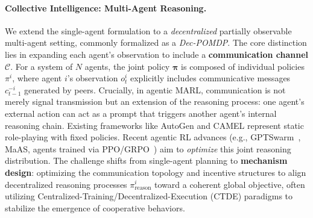 \paragraph{Collective Intelligence: Multi-Agent Reasoning.}
We extend the single-agent formulation to a \emph{decentralized} partially observable multi-agent setting, commonly formalized as a \emph{Dec-POMDP}. The core distinction lies in expanding each agent's observation to include a \textbf{communication channel} $\mathcal{C}$. For a system of $N$ agents, the joint policy $\boldsymbol{\pi}$ is composed of individual policies $\pi^i$, where agent $i$'s observation $o^i_t$ explicitly includes communicative messages $c^{-i}_{t-1}$ generated by peers.
Crucially, in agentic MARL, communication is not merely signal transmission but an extension of the reasoning process: one agent's external action can act as a prompt that triggers another agent's internal reasoning chain.
Existing frameworks like AutoGen \citep{wu2024autogen} and CAMEL \citep{li2023camel} represent static role-playing with fixed policies. Recent agentic RL advances (e.g., GPTSwarm~\cite{zhuge2024gptswarm}, MaAS, agents trained via PPO/GRPO~\cite{hong2025multi}) aim to \emph{optimize} this joint reasoning distribution. The challenge shifts from single-agent planning to \textbf{mechanism design}: optimizing the communication topology and incentive structures to align decentralized reasoning processes $\pi^i_{\text{reason}}$ toward a coherent global objective, often utilizing Centralized-Training/Decentralized-Execution (CTDE) paradigms to stabilize the emergence of cooperative behaviors.

